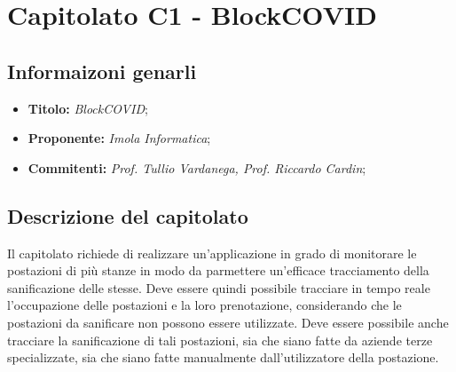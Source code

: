 \section{Capitolato C1 - BlockCOVID}

\subsection{Informaizoni genarli}
\begin{itemize}
    \item \textbf{Titolo:} \textit{BlockCOVID};
    \item \textbf{Proponente:} \textit{Imola Informatica};
    \item \textbf{Commitenti:} \textit{Prof. Tullio Vardanega, Prof. Riccardo Cardin};
\end{itemize}

\subsection{Descrizione del capitolato}
Il capitolato richiede di realizzare un'applicazione in grado di monitorare le postazioni di più stanze in modo da parmettere un'efficace tracciamento della sanificazione delle stesse.
Deve essere quindi possibile tracciare in tempo reale l'occupazione delle postazioni e la loro prenotazione, considerando che le postazioni da sanificare non possono essere utilizzate.
Deve essere possibile anche tracciare la sanificazione di tali postazioni, sia che siano fatte da aziende terze specializzate, sia che siano fatte manualmente dall'utilizzatore della postazione.

